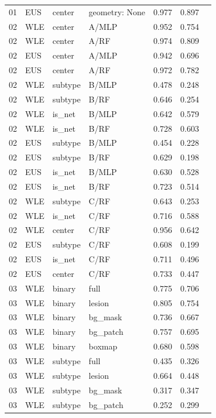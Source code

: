 \begin{longtable}{cL{1.1cm}L{1.5cm}L{5.6cm}ccc}
01 & EUS & center & geometry: None & 0.977 & 0.897 & \nl{} \\
02 & WLE & center & A/MLP & 0.952 & 0.754 & \nl{} \\
02 & WLE & center & A/RF & 0.974 & 0.809 & \nl{} \\
02 & EUS & center & A/MLP & 0.942 & 0.696 & \nl{} \\
02 & EUS & center & A/RF & 0.972 & 0.782 & \nl{} \\
02 & WLE & subtype & B/MLP & 0.478 & 0.248 & \nl{} \\
02 & WLE & subtype & B/RF & 0.646 & 0.254 & \nl{} \\
02 & WLE & is\_net & B/MLP & 0.642 & 0.579 & \nl{} \\
02 & WLE & is\_net & B/RF & 0.728 & 0.603 & \nl{} \\
02 & EUS & subtype & B/MLP & 0.454 & 0.228 & \nl{} \\
02 & EUS & subtype & B/RF & 0.629 & 0.198 & \nl{} \\
02 & EUS & is\_net & B/MLP & 0.630 & 0.528 & \nl{} \\
02 & EUS & is\_net & B/RF & 0.723 & 0.514 & \nl{} \\
02 & WLE & subtype & C/RF & 0.643 & 0.253 & \nl{} \\
02 & WLE & is\_net & C/RF & 0.716 & 0.588 & \nl{} \\
02 & WLE & center & C/RF & 0.956 & 0.642 & \nl{} \\
02 & EUS & subtype & C/RF & 0.608 & 0.199 & \nl{} \\
02 & EUS & is\_net & C/RF & 0.711 & 0.496 & \nl{} \\
02 & EUS & center & C/RF & 0.733 & 0.447 & \nl{} \\
03 & WLE & binary & full & 0.775 & 0.706 & \nl{} \\
03 & WLE & binary & lesion & 0.805 & 0.754 & \nl{} \\
03 & WLE & binary & bg\_mask & 0.736 & 0.667 & \nl{} \\
03 & WLE & binary & bg\_patch & 0.757 & 0.695 & \nl{} \\
03 & WLE & binary & boxmap & 0.680 & 0.598 & \nl{} \\
03 & WLE & subtype & full & 0.435 & 0.326 & \nl{} \\
03 & WLE & subtype & lesion & 0.664 & 0.448 & \nl{} \\
03 & WLE & subtype & bg\_mask & 0.317 & 0.347 & \nl{} \\
03 & WLE & subtype & bg\_patch & 0.252 & 0.299 & \nl{} \\

\end{longtable}

